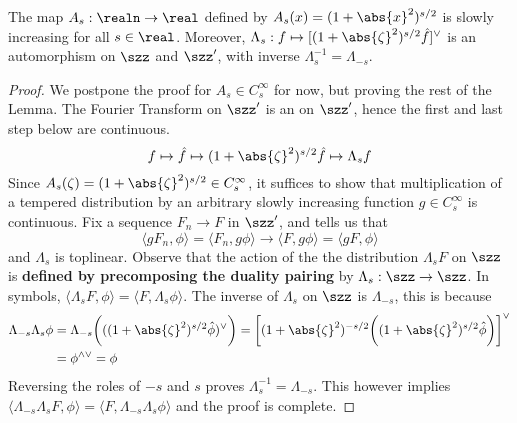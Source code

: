 \documentclass[../main-v2-manifolds.tex]{subfiles}
\begin{document}
\begin{lemma}\label{lem:multiplication sobolev factor automorphism}
The map $A_s: \realn\to\real$ defined by $A_s(x) = (1+\abs{x}^2)^{s/2}$ is slowly increasing for all $s\in\real$. Moreover, $\Lambda_s: f\mapsto [(1+\abs{\zeta}^2)^{s/2}\hat{f}]^{\vee}$ is an automorphism on $\szz$ and $\szz'$, with inverse $\Lambda_s^{-1} = \Lambda_{-s}$.
\end{lemma}
\begin{proof}
    We postpone the proof for $A_s\in C_s^\infty$ for now, but proving the rest of the Lemma. The Fourier Transform on $\szz'$ is an on $\szz'$, hence the first and last step below are continuous. 
    \[
    f\mapsto \hat{f}\mapsto (1+\abs{\zeta}^2)^{s/2} \hat{f} \mapsto \Lambda_s f
    \]
    Since $A_s(\zeta) = (1+\abs{\zeta}^2)^{s/2}\in C_s^\infty$, it suffices to show that multiplication of a tempered distribution by an arbitrary slowly increasing function $g\in C_s^\infty$ is continuous. Fix a sequence $F_n\to F$ in $\szz'$, and  tells us that
    \[
    \langle g F_n,\phi\rangle = \langle F_n, g\phi\rangle\longrightarrow \langle F,g\phi\rangle = \langle g F,\phi\rangle
    \]
    and $\Lambda_s$ is toplinear. Observe that the action of the the distribution $\Lambda_s F$ on $\szz$ is \textbf{defined by precomposing the duality pairing} by $\Lambda_s: \szz\to\szz$. In symbols, $\langle \Lambda_s F,\phi\rangle = \langle F,\Lambda_s\phi\rangle$. The inverse of $\Lambda_s$ on $\szz$ is $\Lambda_{-s}$, this is because
    \begin{align*}
    \Lambda_{-s}\Lambda_s\phi &= \Lambda_{-s}\biggl(((1+\abs{\zeta}^2)^{s/2}\hat{\phi})^{\vee}\biggr)= \biggl[(1+\abs{\zeta}^2)^{-s/2}\biggl((1+\abs{\zeta}^2)^{s/2}\hat{\phi}\biggr)\biggr]^{\vee}\\
    &= \phi^{\wedge\vee}= \phi
    \end{align*}
    Reversing the roles of $-s$ and $s$ proves $\Lambda_s^{-1} = \Lambda_{-s}$. This however implies $\langle\Lambda_{-s}\Lambda_{s}F,\phi\rangle = \langle F,\Lambda_{-s}\Lambda_{s}\phi\rangle$ and the proof is complete.
\end{proof}
\end{document}
